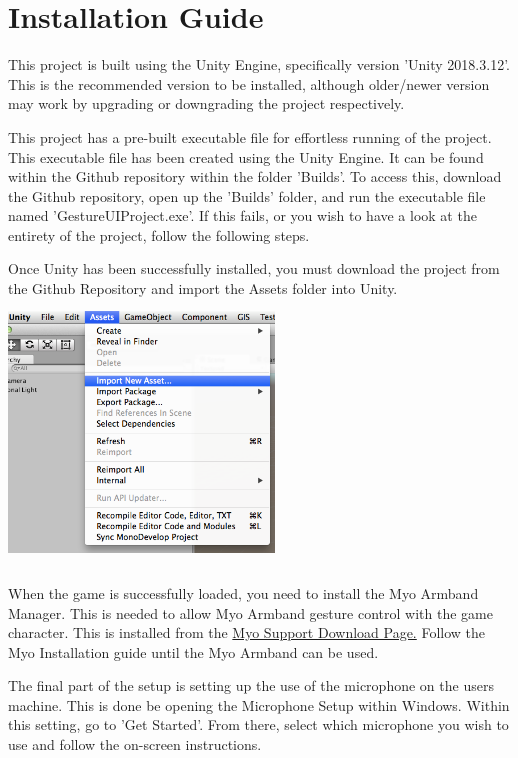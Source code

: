 \documentclass{article}
\begin{document}
\section{Installation Guide}
This project is built using the Unity Engine, specifically version 'Unity 2018.3.12'. This is the recommended version to be installed, although older/newer version may work by upgrading or downgrading the project respectively. 

\bigskip

This project has a pre-built executable file for effortless running of the project. This executable file has been created using the Unity Engine. It can be found within the Github repository within the folder 'Builds'. To access this, download the Github repository, open up the 'Builds' folder, and run the executable file named 'GestureUIProject.exe'. If this fails, or you wish to have a look at the entirety of the project, follow the following steps.

\bigskip

Once Unity has been successfully installed, you must download the project from the Github Repository and import the Assets folder into Unity.\\
\includegraphics[width=200pt, height=200pt]{img/assetImport.png}
\bigskip

When the game is successfully loaded, you need to install the Myo Armband Manager. This is needed to allow Myo Armband gesture control with the game character. This is installed from the \href{https://support.getmyo.com/hc/en-us/articles/360018409792}{Myo Support Download Page.} Follow the Myo Installation guide until the Myo Armband can be used.

The final part of the setup is setting up the use of the microphone on the users machine. This is done be opening the Microphone Setup within Windows. Within this setting, go to 'Get Started'. From there, select which microphone you wish to use and follow the on-screen instructions.
\bigskip
\bigskip
\end{document}
